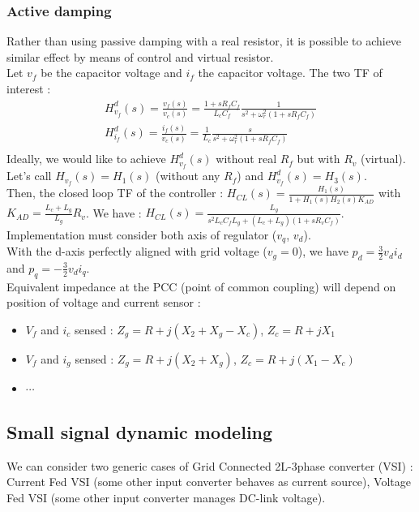 \documentclass[../main.tex]{subfiles}
\begin{document}
\subsubsection{Active damping}
Rather than using passive damping with a real resistor, it is possible to achieve similar effect by means of control and virtual resistor.\\
Let $v_f$ be the capacitor voltage and $i_f$ the capacitor voltage. The two TF of interest : \begin{equation}
    \begin{gathered}
        H^d_{v_f}(s) = \frac{v_f(s)}{v_c(s)} = \frac{1+s R_f C_f}{L_c C_f} \frac{1}{s^2 + \omega_r^2(1+s R_f C_f)}\\
        H^d_{i_f}(s) = \frac{i_f(s)}{v_c(s)} = \frac{1}{L_c} \frac{s}{s^2 + \omega_r^2(1+sR_fC_f)}\\
    \end{gathered}
\end{equation}
Ideally, we would like to achieve $H_{v_f}^d(s)$ without real $R_f$ but with $R_v$ (virtual). Let's call $H_{v_f}(s) = H_1(s)$ (without any $R_f$) and $H_{v_f}^d(s) = H_3(s)$.\\
Then, the closed loop TF of the controller : $H_{CL}(s) = \frac{H_1(s)}{1+H_1(s) H_2(s) K_{AD}}$ with $K_{AD} = \frac{L_c+L_g}{L_g} R_v$. We have : $H_{CL}(s) = \frac{L_g}{s^2 L_c C_f L_g + (L_c+L_g)(1+sR_v C_f)}$.\\
Implementation must consider both axis of regulator ($v_q$, $v_d$).\\
With the d-axis perfectly aligned with grid voltage ($v_g=0$), we have $p_d = \frac{3}{2} v_d i_d$ and $p_q = -\frac{3}{2}v_di_q$. \\
Equivalent impedance at the PCC (point of common coupling) will depend on position of voltage and current sensor : \begin{itemize}
    \item $V_f$ and $i_c$ sensed : $Z_g = R+j(X_2+X_g-X_c)$, $Z_c=R+jX_1$
    \item $V_f$ and $i_g$ sensed : $Z_g = R+j(X_2+X_g)$, $Z_c=R+j(X_1-X_c)$
    \item $\cdots$
\end{itemize}

\subsection{Small signal dynamic modeling}
We can consider two generic cases of Grid Connected 2L-3phase converter (VSI) : Current Fed VSI (some other input converter behaves as current source), Voltage Fed VSI (some other input converter manages DC-link voltage).\\
\end{document}
